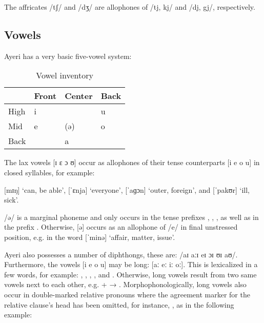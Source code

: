The affricates /tʃ/ and /dʒ/ are allophones of /tj, kj/ and /dj, gj/, 
respectively.

\subsection{Vowels}

Ayeri has a very basic five-vowel system:

\begin{table}\centering
\label{tab:vowels}
\caption{Vowel inventory}
\begin{tabu} to .5\textwidth{H X[c] X[c] X[c]}
\toprule\tableheaderfont

	& Front
	& Center
	& Back
	\\

\toprule

High
	& i
	&
	& u
	\\

Mid
	& e
	& (ə)
	& o
	\\

Back
	&
	& a
	&
	\\

\bottomrule
\end{tabu}
\end{table}

The lax vowels [ɪ ɛ ɔ ʊ] occur as allophones of their tense counterparts 
[i e o u] in closed syllables, for example:

\pex
	\a {} [mɪŋ] `can, be able',
	\a {} [ˈɛnja] `everyone',
	\a {} [ˈaɡɔn] `outer, foreign', and
	\a {} [ˈpakʊr] `ill, sick'.
\xe

/ə/ is a marginal phoneme and only occurs in the tense prefixes 
, , , as 
well as in the prefix . Otherwise, [ə] occurs 
as an allophone of /e/ in final unstressed position, e.g. in the word 
 [ˈminə] `affair, matter, issue'.

Ayeri also possesses a number of diphthongs, these are: /aɪ aːɪ eɪ ɔɪ ʊɪ aʊ/.
Furthermore, the vowels [i e o u] may be long: [aː eː iː oː]. This is 
lexicalized in a few words, for example: , 
, , 
, and . Otherwise, long vowels 
result from two same vowels next to each other, e.g.  + 
 → . 
Morphophonologically, long vowels also occur in double-marked relative pronouns 
where the agreement marker for the relative clause's head has been omitted,
for instance, , as in the following 
example:

